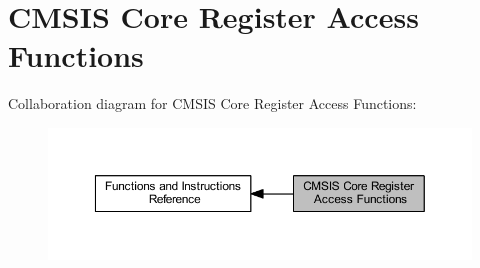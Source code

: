 \hypertarget{group___c_m_s_i_s___core___reg_acc_functions}{}\section{C\+M\+S\+IS Core Register Access Functions}
\label{group___c_m_s_i_s___core___reg_acc_functions}
Collaboration diagram for C\+M\+S\+IS Core Register Access Functions\+:
\nopagebreak
\begin{figure}[H]
\begin{center}
\leavevmode
\includegraphics[width=350pt]{group___c_m_s_i_s___core___reg_acc_functions}
\end{center}
\end{figure}

